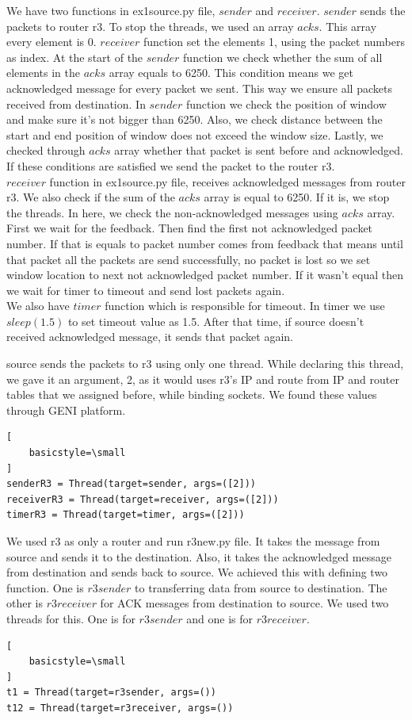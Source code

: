 \documentclass[conference]{IEEEtran}
\begin{document}
We have two functions in ex1source.py file, $sender$ and $receiver$. $sender$ sends the packets to router r3. To stop the threads, we used an array $acks$. This array every element is 0. $receiver$ function set the elements 1, using the packet numbers as index. At the start of the $sender$ function we check whether the sum of all elements in the $acks$ array equals to 6250. This condition means we get acknowledged message for every packet we sent. This way we ensure all packets received from destination. In $sender$ function we check the position of window and make sure it's not bigger than 6250. Also, we check distance between the start and end position of window does not exceed the window size.
Lastly, we checked through $acks$ array whether that packet is sent before and acknowledged. If these conditions are satisfied we send the packet to the router r3.\\

$receiver$ function in ex1source.py file, receives acknowledged messages from router r3. We also check if the sum of the $acks$ array is equal to 6250. If it is, we stop the threads. In here, we check the non-acknowledged messages using $acks$ array. First we wait for the feedback. Then find the first not acknowledged packet number. If that is equals to packet number comes from feedback that means until that packet all the packets are send successfully, no packet is lost so we set window location to next not acknowledged packet number. If it wasn't equal then we wait for timer to timeout and send lost packets again.\\

We also have $timer$ function which is responsible for timeout. In timer we use $sleep(1.5)$ to set timeout value as 1.5. After that time, if source doesn't received acknowledged message, it sends that packet again.

source sends the packets to r3 using only one thread. While declaring this thread, we gave it an argument, 2, as it would uses r3's IP and route from IP and router tables that we assigned before, while binding sockets. We found these values through GENI platform. 
\begin{lstlisting}[
    basicstyle=\small
]
senderR3 = Thread(target=sender, args=([2]))
receiverR3 = Thread(target=receiver, args=([2]))
timerR3 = Thread(target=timer, args=([2]))
\end{lstlisting}

We used r3 as only a router and run r3new.py file. It takes the message from source and sends it to the destination. Also, it takes the acknowledged message from destination and sends back  to source. We achieved this with defining two function. One is $r3sender$ to transferring data from source to destination. The other is $r3receiver$ for ACK messages from destination to source.  We used two threads for this. One is for $r3sender$ and one is for $r3receiver$. 
\begin{lstlisting}[
    basicstyle=\small
]
t1 = Thread(target=r3sender, args=())
t12 = Thread(target=r3receiver, args=())
\end{lstlisting}
\end{document}
